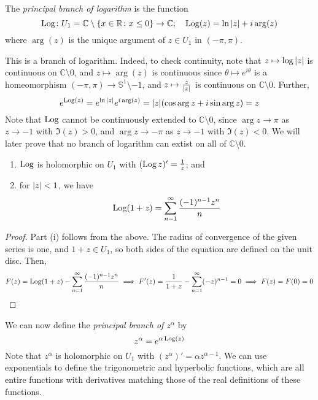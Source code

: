 \begin{definition}
	The \textit{principal branch of logarithm} is the function
	\[
		\operatorname{Log} \colon U_1 = \mathbb C \setminus \qty{x \in \mathbb R \colon x \leq 0} \to \mathbb C;\quad \operatorname{Log}(z) = \ln\abs{z} + i \arg(z)
	\]
	where \( \arg(z) \) is the unique argument of \( z \in U_1 \) in \( (-\pi, \pi) \).
\end{definition}
This is a branch of logarithm.
Indeed, to check continuity, note that \( z \mapsto \log\abs{z} \) is continuous on \( \mathbb C \setminus \qty{0} \), and \( z \mapsto \arg(z) \) is continuous since \( \theta \mapsto e^{i\theta} \) is a homeomorphism \( (-\pi, \pi) \to \mathbb S^1 \setminus \qty{-1} \), and \( z \mapsto \frac{z}{\abs{z}} \) is continuous on \( \mathbb C \setminus \qty{0} \).
Further,
\[
	e^{\operatorname{Log}(z)} = e^{\ln\abs{z}} e^{i \arg(z)} = \abs{z} \qty(\cos \arg z + i \sin \arg z) = z
\]
Note that \( \operatorname{Log} \) cannot be continuously extended to \( \mathbb C \setminus \qty{0} \), since \( \arg z \to \pi \) as \( z \to -1 \) with \( \Im(z) > 0 \), and \( \arg z \to -\pi \) as \( z \to -1 \) with \( \Im(z) < 0 \).
We will later prove that no branch of logarithm can extist on all of \( \mathbb C \setminus \qty{0} \).
\begin{proposition}
	\begin{enumerate}
		\item \( \operatorname{Log} \) is holomorphic on \( U_1 \) with \( (\operatorname{Log} z)' = \frac{1}{z} \); and
		\item for \( \abs{z} < 1 \), we have
		      \[
			      \operatorname{Log}(1+z) = \sum_{n=1}^\infty \frac{(-1)^{n-1} z^n}{n}
		      \]
	\end{enumerate}
\end{proposition}
\begin{proof}
	Part (i) follows from the above.
	The radius of convergence of the given series is one, and \( 1 + z \in U_1 \), so both sides of the equation are defined on the unit disc.
	Then,
	\[
		F(z) = \operatorname{Log}(1+z) - \sum_{n=1}^\infty \frac{(-1)^{n-1}z^n}{n} \implies F'(z) = \frac{1}{1+z} - \sum_{n=1}^\infty (-z)^{n-1} = 0 \implies F(z) = F(0) = 0
	\]
\end{proof}
We can now define the \textit{principal branch of \( z^\alpha \)} by
\[
	z^\alpha = e^{\alpha \operatorname{Log}(z)}
\]
Note that \( z^\alpha \) is holomorphic on \( U_1 \) with \( (z^\alpha)' = \alpha z^{\alpha - 1} \).
We can use exponentials to define the trigonometric and hyperbolic functions, which are all entire functions with derivatives matching those of the real definitions of these functions.

